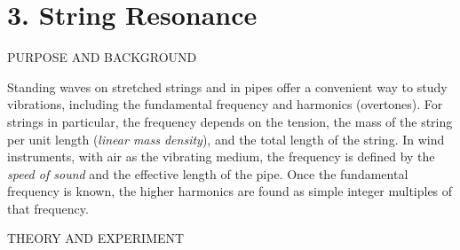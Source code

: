 \documentclass[11pt]{NSF}
\begin{document}
     
\section{3. String Resonance}

PURPOSE AND BACKGROUND

Standing waves on stretched strings and in pipes offer a convenient way to
study vibrations, including the fundamental frequency and harmonics
(overtones). For strings in particular, the frequency depends on the tension,
the mass of the string per unit length ({\em linear mass density}), 
and the total length of the string.
In wind instruments, with air as the vibrating medium, the frequency is defined
by the {\em speed of sound} and the effective length of the pipe. Once the
fundamental frequency is known, the higher harmonics are found as simple integer
multiples of that frequency.

THEORY AND EXPERIMENT
\end{document}
